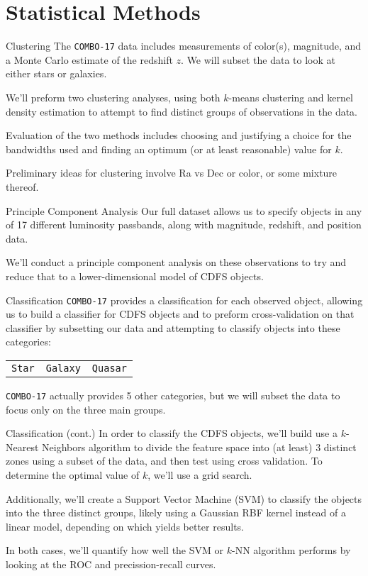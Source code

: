 \documentclass{beamer}
\newcommand{\combo}{{\texttt{COMBO-17}}}
\begin{document}
	\section{Statistical Methods}
	\begin{frame}{Clustering}
		The \combo{} data includes measurements of color(s), magnitude, and a Monte Carlo estimate of the redshift	$z$. We will subset the data to look at either stars or galaxies.

		We'll preform two clustering analyses, using both $k$-means clustering and kernel density estimation to attempt to find distinct groups of observations in the data.

		Evaluation of the two methods includes choosing and justifying a choice for the bandwidths used and finding an optimum (or at least reasonable) value for $k$.

		Preliminary ideas for clustering involve Ra vs Dec or color, or some mixture thereof.
	\end{frame}
	\begin{frame}{Principle Component Analysis}
		Our full dataset allows us to specify objects in any of 17 different luminosity passbands, along with magnitude, redshift, and position data.

		We'll conduct a principle component analysis on these observations to try and reduce that to a lower-dimensional model of CDFS objects.
	\end{frame}
	\begin{frame}{Classification}
		\combo{} provides a classification for each observed object, allowing us to build a classifier for CDFS objects and to preform cross-validation on that classifier by subsetting our data and attempting to classify objects into these categories:
		\begin{center}
			\begin{tabular}{@{}ccc@{}}
				\small\texttt{Star} & \small\texttt{Galaxy} & \small\texttt{Quasar}
			\end{tabular}
		\end{center}
		\combo{} actually provides 5 other categories, but we will subset the data to focus only on the three main groups.
	\end{frame}
	\begin{frame}{Classification (cont.)}
		In order to classify the CDFS objects, we'll build use a $k$-Nearest Neighbors algorithm to divide the feature space into (at least) 3 distinct zones using a subset of the data, and then test using cross validation. To determine the optimal value of $k$, we'll use a grid search.

		Additionally, we'll create a Support Vector Machine (SVM) to classify the objects into the three distinct groups, likely using a Gaussian RBF kernel instead of a linear model, depending on which yields better results.

		In both cases, we'll quantify how well the SVM or $k$-NN algorithm performs by looking at the ROC and precission-recall curves.
	\end{frame}
\end{document}
